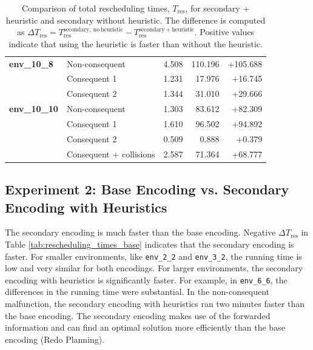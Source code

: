 \documentclass[runningheads]{llncs}
\begin{document}
\begin{table}[hbtp]
\begin{tabular}{@{}llrrr@{}}
		\textbf{env\_10\_8}
		& Non-consequent & 4.508 & 110.196 & +105.688 \\
		& Consequent 1 & 1.231 & 17.976 & +16.745 \\
		& Consequent 2 & 1.344 & 31.010 & +29.666 \\
		
		\midrule
		
		\textbf{env\_10\_10}
		& Non-consequent & 1.303 & 83.612 & +82.309 \\
		& Consequent 1 & 1.610 & 96.502 & +94.892 \\
		& Consequent 2 & 0.509 & 0.888 & +0.379 \\
		& Consequent + collisions & 2.587 & 71.364 & +68.777 \\
		
		\bottomrule
	\end{tabular}
	\vspace{4mm}
	\caption{Comparison of total rescheduling times, $T_{\mathrm{res}}$, for secondary + heuristic and secondary without heuristic. The difference is computed as $\Delta T_{\mathrm{res}} = T_{\mathrm{res}}^{\mathrm{secondary,\ no\ heuristic}} - T_{\mathrm{res}}^{\mathrm{secondary+heuristic}}$. Positive values indicate that using the heuristic is faster than without the heuristic.}
	\label{tab:rescheduling_times_heuristic}
\end{table}

\subsection{Experiment 2: Base Encoding vs. Secondary Encoding with Heuristics}

The secondary encoding is much faster than the base encoding.
Negative $\Delta T_{\mathrm{res}}$ in Table \ref{tab:rescheduling_times_base} indicates that the secondary encoding is faster. For smaller environments, like \texttt{env\_2\_2} and \texttt{env\_3\_2}, the running time is low and very similar for both encodings.
For larger environments, the secondary encoding with heuristics is significantly faster.
For example, in \texttt{env\_6\_6}, the differences in the running time were substantial.
In the non-consequent malfunction, the secondary encoding with heuristics ran two minutes faster than
the base encoding. 
The secondary encoding makes use of the forwarded information and can find an optimal solution more efficiently than the base encoding (Redo Planning).
\end{document}
